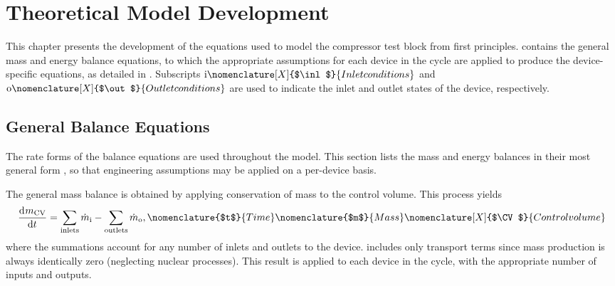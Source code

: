 \chapter{Theoretical Model Development} \label{cha:modeldev}
This chapter presents the development of the equations used to model 
the compressor test block from first principles. 
 contains the general mass and energy balance equations, 
to which the appropriate assumptions for each device in the cycle are applied 
to produce the device-specific equations, as detailed in . 
Subscripts $\inl\nomenclature[X]{$\inl$}{Inlet conditions}$ 
and $\out\nomenclature[X]{$\out$}{Outlet conditions}$ 
are used to indicate the inlet and outlet states of the device, respectively. 

\section{General Balance Equations} \label{sec:GenBal}
The rate forms of the balance equations are used throughout the model.
This section lists the mass and energy balances in their most general form \parencite{cengel2011}, 
so that engineering assumptions may be applied on a per-device basis.

The general mass balance is obtained by 
applying conservation of mass to the control volume. 
This process yields
\begin{equation}
	\dod{m_\CV}{t} = \sum_{\text{inlets}}{\dot{m}_\inl} - \sum_{\text{outlets}}{\dot{m}_\out},
  \label{eqn:GenMass}
	\nomenclature{$t$}{Time\nomunit{\minute}} 
  \nomenclature{$m$}{Mass\nomunit{\poundmass}} 
	\nomenclature[X]{$\CV$}{Control volume}
\end{equation}
where the summations account for any number of inlets and outlets to the device.
 includes only transport terms since mass production is 
always identically zero (neglecting nuclear processes).
This result is applied to each device in the cycle, with the appropriate number of inputs and outputs.

